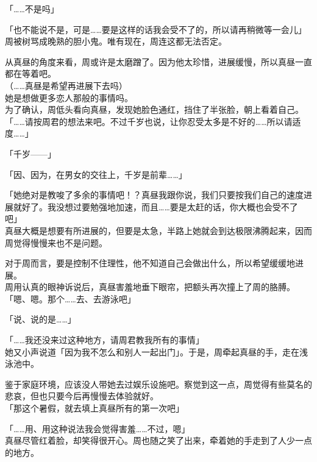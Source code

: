 「……不是吗」

「也不能说不是，可是……要是这样的话我会受不了的，所以请再稍微等一会儿」\\

周被树骂成晚熟的胆小鬼。唯有现在，周连这都无法否定。

从真昼的角度来看，周或许是太磨蹭了。因为他太珍惜，进展缓慢，所以真昼一直都在等着吧。\\

（……真昼是希望再进展下去吗）\\

她是想做更多恋人那般的事情吗。\\

为了确认，周低头看向真昼，发现她脸色通红，挡住了半张脸，朝上看着自己。\\

「……请按周君的想法来吧。不过千岁也说，让你忍受太多是不好的……所以请适度……」

「千岁——」

「因、因为，在男女的交往上，千岁是前辈……」

「她绝对是教唆了多余的事情吧！？真昼我跟你说，我们只要按我们自己的速度进展就好了。我没想过要勉强地加速，而且……要是太赶的话，你大概也会受不了吧」\\

真昼大概是想要有所进展的，但要是太急，半路上她就会到达极限沸腾起来，因而周觉得慢慢来也不是问题。

对于周而言，要是控制不住理性，他不知道自己会做出什么，所以希望缓缓地进展。\\

周用认真的眼神诉说后，真昼害羞地垂下眼帘，把额头再次撞上了周的胳膊。\\

「嗯、嗯。那个……去、去游泳吧」

「说、说的是……」

「……我还没来过这种地方，请周君教我所有的事情」\\

她又小声说道「因为我不怎么和别人一起出门」。于是，周牵起真昼的手，走在浅泳池中。

鉴于家庭环境，应该没人带她去过娱乐设施吧。察觉到这一点，周觉得有些莫名的悲哀，但也只要今后再慢慢去体验就好。\\

「那这个暑假，就去填上真昼所有的第一次吧」

「……用、用这种说法我会觉得害羞……不过，嗯」\\

真昼尽管红着脸，却笑得很开心。周也随之笑了出来，牵着她的手走到了人少一点的地方。
